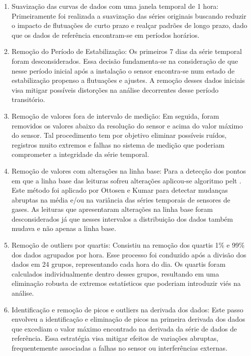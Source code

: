 \begin{enumerate}
    \item Suavização das curvas de dados com uma janela temporal de 1 hora: Primeiramente foi realizada a suavização das séries originais buscando reduzir o impacto de flutuações de curto prazo e realçar padrões de longo prazo, dado que os dados de referência encontram-se em períodos horários.
    \item Remoção do Período de Estabilização: Os primeiros 7 dias da série temporal foram desconsiderados. Essa decisão fundamenta-se na consideração de que nesse período inicial após a instalação o sensor encontra-se num estado de estabilização propenso a flutuações e ajustes. A remoção desses dados iniciais visa mitigar possíveis distorções na análise decorrentes desse período transitório.
    \item Remoção de valores fora de intervalo de medição: Em seguida, foram removidos os valores abaixo da resolução do sensor e acima do valor máximo do sensor. Tal procedimento tem por objetivo eliminar possíveis ruídos, registros muito extremos e falhas no sistema de medição que poderiam comprometer a integridade da série temporal.
    \item Remoção de valores com alterações na linha base: Para a detecção dos pontos em que a linha base das leituras sofreu alterações aplicou-se algoritmo \acrshort{pelt} \cite{Killick2012OptimalCost}. Este método foi aplicado por Ottosen e Kumar \cite{Ottosen2019OutlierMeasurements} para detectar mudanças abruptas na média e/ou na variância das séries temporais de sensores de gases. As leituras que apresentaram alterações na linha base foram desconsiderados já que nesses intervalos a distribuição dos dados também mudava e não apenas a linha base.
    \item Remoção de outliers por quartis: Consistiu na remoção dos quartis 1\% e 99\% dos dados agrupados por hora. Esse processo foi conduzido após a divisão dos dados em 24 grupos, representando cada hora do dia. Os quartis foram calculados individualmente dentro desses grupos, resultando em uma eliminação robusta de extremos estatísticos que poderiam introduzir viés na análise.
    \item Identificação e remoção de picos e outliers na derivada dos dados: Este passo envolveu a identificação e eliminação de picos na primeira derivada dos dados que excediam o valor máximo encontrado na derivada da série de dados de referência. Essa estratégia visa mitigar efeitos de variações abruptas, frequentemente associadas a falhas no sensor ou interferências externas.

\end{enumerate}
